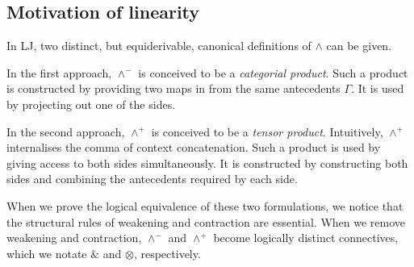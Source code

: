 \subsection{Motivation of linearity}

In LJ, two distinct, but equiderivable, canonical definitions of $\wedge$ can
be given.

In the first approach, $\wedge^-$ is conceived to be a
\emph{categorial product}.
Such a product is constructed by providing two maps in from the same antecedents
$\Gamma$.
It is used by projecting out one of the sides.


In the second approach, $\wedge^+$ is conceived to be a \emph{tensor product}.
Intuitively, $\wedge^+$ internalises the comma of context concatenation.
Such a product is used by giving access to both sides simultaneously.
It is constructed by constructing both sides and combining the antecedents
required by each side.


When we prove the logical equivalence of these two formulations, we notice that
the structural rules of weakening and contraction are essential.
When we remove weakening and contraction, $\wedge^-$ and $\wedge^+$ become
logically distinct connectives, which we notate $\&$ and $\otimes$,
respectively.


